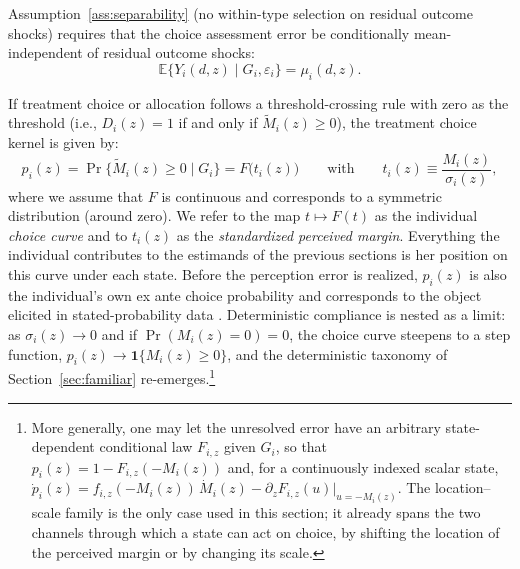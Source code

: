\documentclass[11pt]{article}
\newcommand{\E}{\mathbb{E}}
\newcommand{\1}{\mathbf{1}}
\begin{document}
Assumption~\ref{ass:separability} (no within-type selection on residual outcome shocks) requires that the 
 choice assessment error be conditionally mean-independent of 
residual outcome shocks:
\[
\E\{Y_i(d,z)\mid G_i,\varepsilon_i\}=\mu_i(d,z).
\]

If treatment choice or allocation follows a threshold-crossing rule with zero as the threshold (i.e., $D_i(z)=1$ if and only if $\widetilde M_i(z)\geq 0$), the treatment choice kernel is given by:
\begin{equation}
p_i(z)
=
\Pr\{\widetilde M_i(z)\geq 0\mid G_i\}
=
F\big(t_i(z)\big)
\qquad \textrm{with} \qquad
t_i(z)\equiv\frac{M_i(z)}{\sigma_i(z)},
\label{eq:choice_curve}
\end{equation}
where we assume that \(F\) is continuous and corresponds to a symmetric distribution (around zero).
We refer to the map \(t\mapsto F(t)\) as the individual \emph{choice curve}
and to \(t_i(z)\) as the \emph{standardized perceived margin}. Everything
the individual contributes to the estimands of the previous sections is her
position on this curve under each state. Before the perception error is
realized, \(p_i(z)\) is also the individual's own ex ante choice
probability and corresponds to the object elicited in stated-probability data
\citep{blasslachmanski2010,arcidiaconoetal2020,briggsetal2024}.
Deterministic compliance is nested as a limit: as \(\sigma_i(z)\to0\) and if \(\Pr(M_i(z)=0)=0\), the
choice curve steepens to a step function, \(p_i(z)\to\1\{M_i(z)\ge 0\}\), and
the deterministic taxonomy of Section~\ref{sec:familiar}
re-emerges.\footnote{More generally, one may let the unresolved error have
an arbitrary state-dependent conditional law \(F_{i,z}\) given \(G_i\), so
that \(p_i(z)=1-F_{i,z}(-M_i(z))\) and, for a continuously indexed scalar
state,
\(\dot p_i(z)=f_{i,z}(-M_i(z))\,\dot M_i(z)
-\partial_z F_{i,z}(u)\big|_{u=-M_i(z)}\).
The location--scale family is the only case used in this section; it
already spans the two channels through which a state can act on choice,
by shifting the location of the perceived margin or by changing its
scale.}
\end{document}
